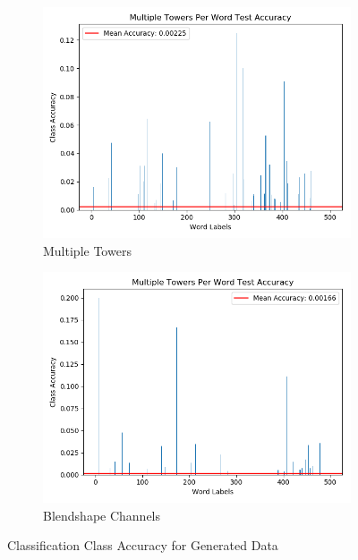 \begin{figure}[h!]
    \centering
    \begin{subfigure}[b]{0.49\textwidth}
        \includegraphics[width=\textwidth]{figures/gan/multiple_towers_acc.png}
        \caption{Multiple Towers}\label{fig:gan_multi_towers}
    \end{subfigure}
    \begin{subfigure}[b]{0.49\textwidth}
        \includegraphics[width=\textwidth]{figures/gan/channels_acc.png}
        \caption{Blendshape Channels}\label{fig:gan_blendshape_channels}
    \end{subfigure}
    \caption{Classification Class Accuracy for Generated Data}\label{fig:gan_class_acc}
\end{figure}

